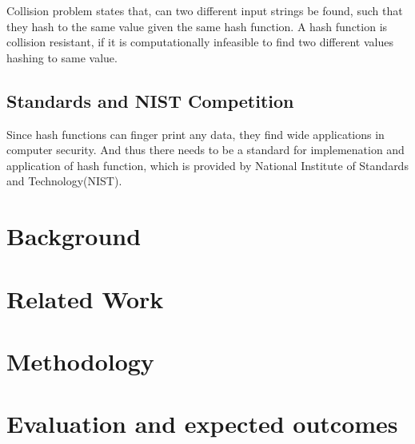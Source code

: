 \documentclass[12pt]{artikel3}                  %
\begin{document}
Collision problem states that, can two different input strings be found, such that they hash to the same
 value given the same hash function. A hash function is collision resistant, if it is computationally
 infeasible to find two different values hashing to same value.

\subsection{Standards and NIST Competition}

Since hash functions can finger print any data, they find wide applications in computer security. And thus there
needs to be a standard for implemenation and application of hash function, which is provided by National Institute
 of Standards and Technology(NIST). 
 
\section{Background}

\section{Related Work}

\section{Methodology}

\section{Evaluation and expected outcomes}



\end{document}
